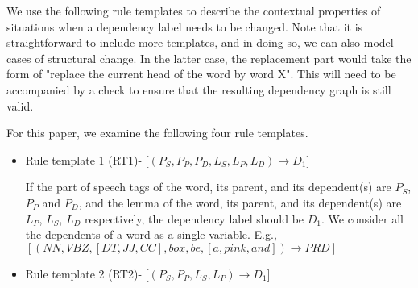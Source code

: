 
 
 We use the following rule templates to describe the contextual properties of situations when a dependency label needs to be changed. Note that it is straightforward to include more templates, and in doing so, we can also model cases of structural change. In the latter case, the replacement part would take the form of "replace the current head of the word by word X". This will need to be accompanied by a check to ensure that the resulting dependency graph is still valid.

For this paper, we examine the following four rule templates.
\begin{itemize}

    \item Rule template 1 (RT1)- [${(P_S, P_P, P_D, L_S, L_P, L_D) \rightarrow D_1 }$]
    
    If the part of speech tags of the word, its parent, and its dependent(s) are $P_S$, $P_P$ and $P_D$, and the lemma of the word, its parent, and its dependent(s) are $L_P$, $L_S$, $L_D$ respectively, the dependency label should be $D_1$.
    We consider all the dependents of a word as a single variable. E.g., 
    ${[(NN, VBZ, [DT, JJ, CC], box, be, [a, pink, and]) \rightarrow PRD ]}$
    

    
    
    \item Rule template 2 (RT2)- [${(P_S, P_P, L_S, L_P) \rightarrow D_1 } $]
    

\end{itemize}
